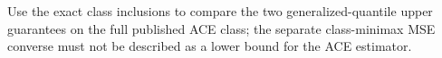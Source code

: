Use the exact class inclusions to compare the two generalized-quantile upper guarantees on the full published ACE class; the separate class-minimax MSE converse must not be described as a lower bound for the ACE estimator.